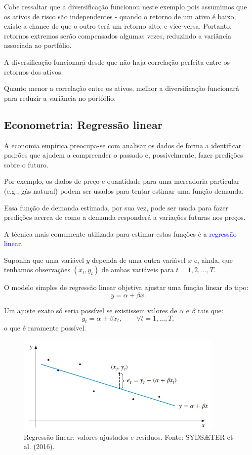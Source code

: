 \documentclass[preprintnumbers,nofootinbib,amsmath,amssymb,12pt]{article}
\begin{document}
    Cabe ressaltar que a diversificação funcionou neste exemplo pois assumimos que os ativos de risco são independentes - quando o retorno de um ativo é baixo, existe a chance de que o outro terá um retorno alto, e vice-versa. Portanto, retornos extremos serão compensados algumas vezes, reduzindo a variância associada ao portfólio.
    
    A diversificação funcionará desde que não haja correlação perfeita entre os retornos dos ativos.
    
    Quanto menor a correlação entre os ativos, melhor a diversificação funcionará para reduzir a variância no portfólio.
    
    \newpage
    \subsection{Econometria: Regressão linear}
    A economia empírica preocupa-se com analisar os dados de forma a identificar padrões que ajudem a compreender o passado e, possivelmente, fazer predições sobre o futuro.
    
    Por exemplo, os dados de preço e quantidade para uma mercadoria particular (e.g., gás natural) podem ser usados para tentar estimar uma função demanda.
    
    Essa função de demanda estimada, por sua vez, pode ser usada para fazer predições acerca de como a demanda responderá a variações futuras nos preços.
    
    A técnica mais comumente utilizada para estimar estas funções é a \textcolor{blue}{regressão linear}.
    
    Suponha que uma variável $y$ dependa de uma outra variável $x$ e, ainda, que tenhamos observações $(x_t, y_t)$ de ambas variáveis para $t = 1, 2, \dots, T$.
    
    O modelo simples de regressão linear objetiva ajustar uma função linear do tipo:
    \[
    y = \alpha + \beta x.
    \]
    
    Um ajuste exato só seria possível se existissem valores de $\alpha$ e $\beta$ tais que:
    \[
    y_t = \alpha + \beta x_t, \qquad \forall t = 1, \dots, T,
    \]
    o que é raramente possível.
    
\begin{figure}[h!]
        \centering
        \includegraphics[width=0.9\textwidth]{./figures/aula6_fig2.JPG}
        \caption{Regressão linear: valores ajustados e resíduos. Fonte: SYDSÆTER et al. (2016).}
        \label{fig2}
\end{figure}
    
\end{document}
